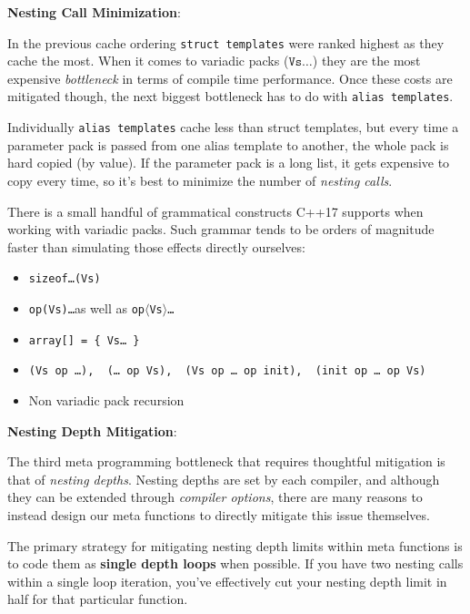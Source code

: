 \documentclass[twoside]{article}
\newcommand{\strong}[1]{{\bfseries #1}}
\begin{document}
\begin{minipage}{15cm}
\begin{list}{.}{\setcounter{three}{2}}
\item \strong{Nesting Call Minimization}:

	In the previous cache ordering \texttt{struct templates} were ranked highest as they cache the most.
	When it comes to variadic packs ($ \texttt{Vs}\ldots $) they are the most expensive \emph{bottleneck}
	in terms of compile time performance. Once these costs are mitigated though, the next biggest bottleneck
	has to do with \texttt{alias templates}.

	Individually \texttt{alias templates} cache less than struct templates, but every time a parameter pack
	is passed from one alias template to another, the whole pack is hard copied (by value). If the parameter pack
	is a long list, it gets expensive to copy every time, so it's best to minimize the number of \emph{nesting calls}.

	There is a small handful of grammatical constructs C++17 supports when working with variadic packs.
	Such grammar tends to be orders of magnitude faster than simulating those effects directly ourselves:

	\begin{itemize}
	\item \texttt{sizeof\ldots(Vs)}
	\item \texttt{op(Vs)\ldots}\qquad as well as \qquad \texttt{op$\langle$Vs$\rangle$\ldots}
	\item \texttt{array[] = \{ Vs\ldots\ \}}
	\item \texttt{(Vs\ op\ \ldots), \ (\ldots\ op Vs), \ (Vs\ op\ \ldots\ op\ init), \ (init\ op\ \ldots\ op\ Vs)}
	\item Non variadic pack recursion
	\end{itemize}

\item \strong{Nesting Depth Mitigation}:

	The third meta programming bottleneck that requires thoughtful mitigation is that of \emph{nesting depths}.
	Nesting depths are set by each compiler, and although they can be extended through \emph{compiler options},
	there are many reasons to instead design our meta functions to directly mitigate this issue themselves.

	The primary strategy for mitigating nesting depth limits within meta functions is to code them as \strong{single
	depth loops} when possible. If you have two nesting calls within a single loop iteration, you've effectively
	cut your nesting depth limit in half for that particular function.


\end{list}
\end{minipage}
\end{document}
